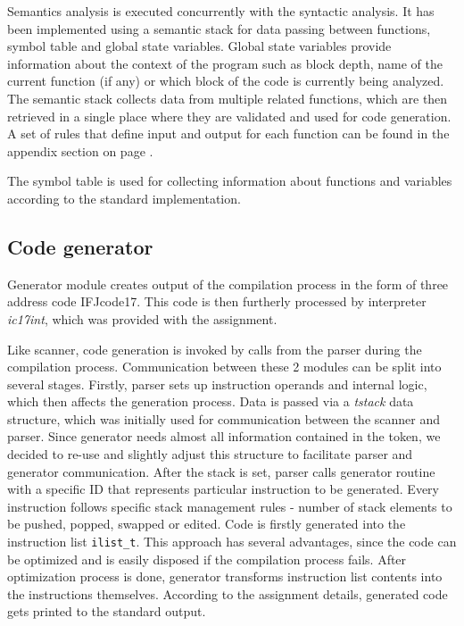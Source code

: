 \documentclass[a4paper, 11pt]{article}
\begin{document}
Semantics analysis is executed concurrently with the syntactic analysis. It has been implemented using a semantic stack for data passing between functions, symbol table and global state variables. Global state variables provide information about the context of the program such as block depth, name of the current function (if any) or which block of the code is currently being analyzed. The semantic stack collects data from multiple related functions, which are then retrieved in a single place where they are validated and used for code generation. A set of rules that define input and output for each function can be found in the appendix section on page \pageref{fig:sem_stack_rules}.

The symbol table is used for collecting information about functions and variables according to the standard implementation.

\subsection{Code generator}

Generator module creates output of the compilation process in the form of three address code IFJcode17. This code is then furtherly processed by interpreter \emph{ic17int}, which was provided with the assignment.

Like scanner, code generation is invoked by calls from the parser during the compilation process. Communication between these 2 modules can be split into several stages. Firstly, parser sets up instruction operands and internal logic, which then affects the generation process. Data is passed via a \emph{tstack} data structure, which was initially used for communication between the scanner and parser. Since generator needs almost all information contained in the token, we decided to re-use and slightly adjust this structure to facilitate parser and generator communication. After the stack is set, parser calls generator routine with a specific ID that represents particular instruction to be generated. Every instruction follows specific stack management rules - number of stack elements to be pushed, popped, swapped or edited. Code is firstly generated into the instruction list \texttt{ilist\_t}. This approach has several advantages, since the code can be optimized and is easily disposed if the compilation process fails. After optimization process is done, generator transforms instruction list contents into the instructions themselves. According to the assignment details, generated code gets printed to the standard output.
\end{document}
